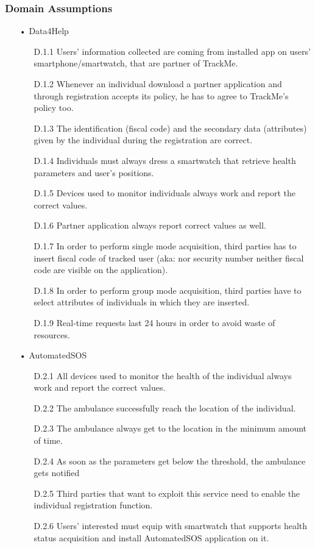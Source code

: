 \subsubsection{Domain Assumptions}
\begin{enumerate}

\item[•] {\Large Data4Help}
	\begin{enumerate}
	\item [D.1.1] Users' information collected are coming from installed app on users' smartphone/smartwatch, that are partner of TrackMe.
	\item [D.1.2] Whenever an individual download a partner application and through registration accepts its policy, he has to agree to TrackMe's policy too.
	
	
	
	\item [D.1.3] The identification (fiscal code) and the secondary data (attributes) given by the individual during the registration are correct.
    \item [D.1.4] Individuals must always dress a smartwatch that retrieve health parameters and user's positions.
    \item [D.1.5] Devices used to monitor individuals always work and report the correct values.
    \item [D.1.6] Partner application always report correct values as well.
	\item [D.1.7] In order to perform single mode acquisition, third parties has to insert fiscal code of tracked user (aka: nor security number neither fiscal code are visible on the application).
	\item [D.1.8] In order to perform group mode acquisition, third parties have to select attributes of individuals in which they are inserted.
	\item [D.1.9] Real-time requests last 24 hours in order to avoid waste of resources.
	\end{enumerate}
	
\item[•] {\Large AutomatedSOS}
	\begin{enumerate}
	\item [D.2.1] All devices used to monitor the health of the individual always work and report the correct values.
    \item [D.2.2] The ambulance successfully reach the location of the individual.
    \item [D.2.3] The ambulance always get to the location in the minimum amount of time.
    \item [D.2.4] As soon as the parameters get below the threshold, the ambulance gets notified
    \item [D.2.5] Third parties that want to exploit this service need to enable the individual registration function.
    \item [D.2.6] Users' interested must equip with smartwatch that supports health status acquisition and install AutomatedSOS application on it.
	\end{enumerate}
	

\end{enumerate}
